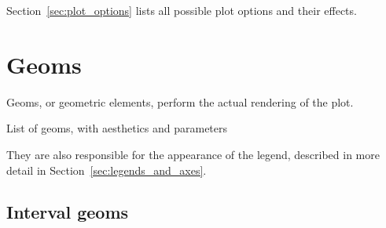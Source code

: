 Section~\ref{sec:plot_options} lists all possible plot options and their effects.



% 
% 
% 
% 
% 
% 
% 
% 
% 



\section{Geoms}
\label{sec:geom}

Geoms, or geometric elements, perform the actual rendering of the plot.

List of geoms, with aesthetics and parameters

They are also responsible for the appearance of the legend, described in more detail in Section~\ref{sec:legends_and_axes}.


\subsection{Interval geoms}
\label{sub:interval_geoms}


